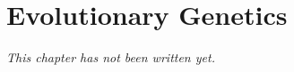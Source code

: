 \chapter{Evolutionary Genetics}\label{ch:b2:evo-gen}


\emph{This chapter has not been written yet.}
